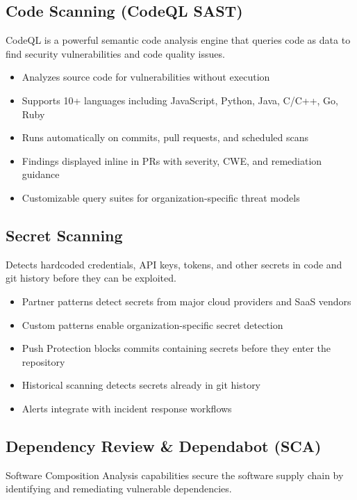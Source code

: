 \documentclass[11pt]{article}
\begin{document}
\subsection{Code Scanning (CodeQL SAST)}

CodeQL is a powerful semantic code analysis engine that queries code as data to find security vulnerabilities and code quality issues.

\begin{itemize}[leftmargin=*]
\item Analyzes source code for vulnerabilities without execution
\item Supports 10+ languages including JavaScript, Python, Java, C/C++, Go, Ruby
\item Runs automatically on commits, pull requests, and scheduled scans
\item Findings displayed inline in PRs with severity, CWE, and remediation guidance
\item Customizable query suites for organization-specific threat models
\end{itemize}
\subsection{Secret Scanning}

Detects hardcoded credentials, API keys, tokens, and other secrets in code and git history before they can be exploited.

\begin{itemize}[leftmargin=*]
\item Partner patterns detect secrets from major cloud providers and SaaS vendors
\item Custom patterns enable organization-specific secret detection
\item Push Protection blocks commits containing secrets before they enter the repository
\item Historical scanning detects secrets already in git history
\item Alerts integrate with incident response workflows
\end{itemize}
\subsection{Dependency Review \& Dependabot (SCA)}

Software Composition Analysis capabilities secure the software supply chain by identifying and remediating vulnerable dependencies.
\end{document}
